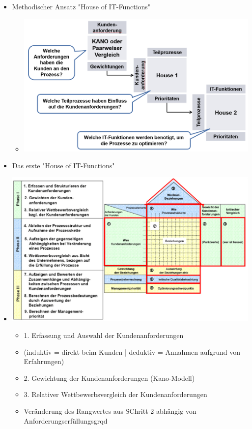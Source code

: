 \documentclass[11pt,a4paper]{article}
\begin{document}
\begin{itemize}
\item Methodischer Ansatz "House of IT-Functions"
	\begin{itemize}
	\item[] \includegraphics[width=15cm]{Bilder/methodhouseofit}
	\end{itemize}
	\item Das erste "House of IT-Functions"
	\item[] \includegraphics[width=17cm]{Bilder/houseofit1}
		\begin{itemize}
		\item 1. Erfassung und Auswahl der Kundenanforderungen 
		\item[] (induktiv = direkt beim Kunden | deduktiv = Annahmen aufgrund von Erfahrungen)
		\item 2. Gewichtung der Kundenanforderungen (Kano-Modell)
		\item 3. Relativer Wettbewerbsvergleich der Kundenanforderungen
		\item[] Veränderung des Rangwertes aus SChritt 2 abhängig von Anforderungserfüllungsgrqd

\end{itemize}
\end{itemize}
\end{document}
